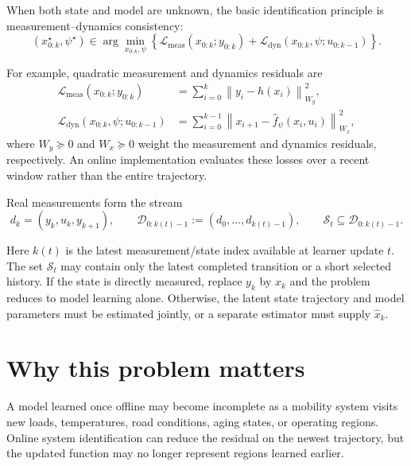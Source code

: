 \documentclass[a4paper]{article}
\begin{document}
When both state and model are unknown, the basic identification principle is
measurement--dynamics consistency:
\begin{equation}
  \left(x_{0:k}^{\star},\psi^{\star}\right)
  \in
  \arg\min_{x_{0:k},\psi}
  \left\{
  \mathcal L_{\mathrm{meas}}(x_{0:k};y_{0:k})
  +
  \mathcal L_{\mathrm{dyn}}(x_{0:k},\psi;u_{0:k-1})
  \right\}.
\end{equation}

For example, quadratic measurement and dynamics residuals are
\begin{equation}
  \begin{aligned}
  \mathcal L_{\mathrm{meas}}(x_{0:k};y_{0:k})
  &=
  \sum_{i=0}^{k}
  \left\|y_i-h(x_i)\right\|_{W_y}^{2},\\
  \mathcal L_{\mathrm{dyn}}(x_{0:k},\psi;u_{0:k-1})
  &=
  \sum_{i=0}^{k-1}
  \left\|
  x_{i+1}-\widehat f_{\psi}(x_i,u_i)
  \right\|_{W_x}^{2},
  \end{aligned}
\end{equation}
where $W_y\succeq0$ and $W_x\succeq0$ weight the measurement and dynamics
residuals, respectively. An online implementation evaluates these losses over
a recent window rather than the entire trajectory.

Real measurements form the stream
\begin{equation}
  d_k=(y_k,u_k,y_{k+1}),
  \qquad
  \mathcal D_{0:k(t)-1}
  :=
  (d_0,\ldots,d_{k(t)-1}),
  \qquad
  \mathcal S_t\subseteq\mathcal D_{0:k(t)-1}.
\end{equation}

Here $k(t)$ is the latest measurement/state index available at learner update
$t$. The set $\mathcal S_t$ may contain only the latest completed transition
or a short selected history. If the state is directly measured, replace $y_k$
by $x_k$ and the problem reduces to model learning alone. Otherwise, the
latent state trajectory and model parameters must be estimated jointly, or a
separate estimator must supply $\widehat x_k$.

\section{Why this problem matters}

A model learned once offline may become incomplete as a mobility system visits
new loads, temperatures, road conditions, aging states, or operating regions.
Online system identification can reduce the residual on the newest trajectory,
but the updated function may no longer represent regions learned earlier.
\end{document}
